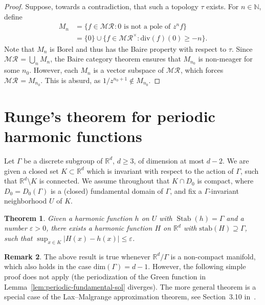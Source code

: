 \documentclass[12pt]{paper}
\numberwithin{equation}{section}
\theoremstyle{plain}
\newtheorem{theorem}{Theorem}[section]
\theoremstyle{definition}
\newtheorem{remark}[theorem]{Remark}
\newcommand{\N}{\mathbb{N}}
\newcommand{\Rd}{\mathbb{R}^{d}}
\newcommand{\merom}[1][]{\mathcal{MR}_{#1}}
\newcommand{\meromnz}{\merom^{\times}}
\newcommand{\dm}{\mathrm{div}}      %
\DeclareMathOperator{\stab}{\mathrm{Stab}}
\renewcommand{\epsilon}{\varepsilon}
\begin{document}
\begin{proof}
  Suppose, towards a contradiction, that such a topology \(\tau\) exists.  For \(n \in \N\), define
  \begin{displaymath}
    \begin{aligned}
      M_{n}&=\{f \in \merom : 0 \textrm{ is not a pole of } z^{n}f\} \\
           &= \{0\} \cup \{f \in \meromnz :
             \dm(f)(0) \ge -n\}.
    \end{aligned}
  \end{displaymath}
  Note that \(M_{n}\) is Borel and thus has the Baire property with respect to \(\tau\).  Since
  \(\merom = \bigcup_{n} M_{n}\), the Baire category theorem ensures that \(M_{n_{0}}\) is
  non-meager for some \(n_{0}\).  However, each \(M_{n}\) is a vector subspace of \(\merom\), which
  forces \(\merom = M_{n_{0}}\). This is absurd, as \(1/z^{n_{0}+1} \not \in M_{n_{0}}\).
\end{proof}














\section{Runge's theorem for periodic harmonic functions}
\label{sec:rung-theor-peri}

Let \(\Gamma\) be a discrete subgroup of \(\Rd\), \(d\ge 3\), of dimension at most \(d-2\). We are
given a closed set \(K\subset \Rd\) which is invariant with respect to the action of
\(\Gamma\), such that \(\Rd\setminus K\) is connected.  We assume throughout that
\(K\cap D_0\) is compact, where \(D_0=D_0(\Gamma)\) is a (closed) fundamental domain of \(\Gamma\),
and fix a \(\Gamma\)-invariant neighborhood \(U\) of \(K\).

\begin{theorem}
  \label{thm:periodic-Runge}
  Given a harmonic function \(h\) on \(U\) with \(\stab(h)=\Gamma\) and a number \(\epsilon>0\),
  there exists a harmonic function \(H\) on \(\Rd\) with
  \(\mathrm{stab}(H)\supseteq\Gamma\), such that \(\sup_{x\in K}|H(x)-h(x)|\le \epsilon\).
\end{theorem}

\begin{remark}
  The above result is true whenever \(\Rd/\Gamma\) is a non-compact manifold, which also
  holds in the case \(\mathrm{dim}(\Gamma)=d-1\). However, the following simple proof does not apply
  (the periodization of the Green function in Lemma~\ref{lem:periodic-fundamental-sol}
  diverges). The more general theorem is a special case of the Lax--Malgrange approximation theorem,
  see Section~3.10 in~\cite{narasimhanAnalysisRealComplex1985}.
\end{remark}
\end{document}
